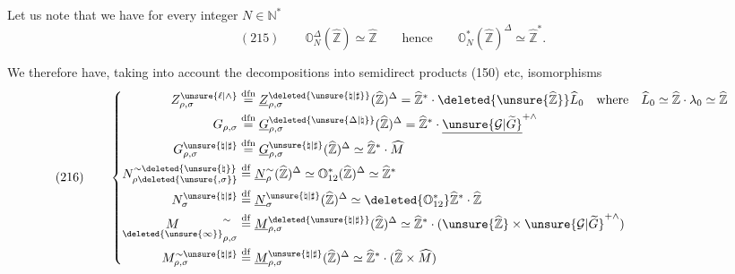 Let us note that we have for every integer $N\in\mathbb N^{*}$
\[
(215)\qquad
\mathbb O_{N}^{\Delta}
(\widehat{\mathbb Z})\simeq\widehat{\mathbb Z}
\qquad\text{hence}\qquad
\mathbb O_{N}^{*}(\widehat{\mathbb Z})^{\Delta}
\simeq\widehat{\mathbb Z}^{*}.
\]

We therefore have, taking into account the decompositions into semidirect products (150) etc,
isomorphisms
\[
(216)\qquad
\left\{\begin{aligned}
Z_{\rho,\sigma}^{\unsure{\ell|\wedge}}
&\overset{\mathrm{dfn}}{=}
\underline Z_{\rho,\sigma}^{\deleted{\unsure{\natural|\sharp}}}
(\widehat{\mathbb Z})^{\Delta}
=\widehat{\mathbb Z}^{*}\cdot
\deleted{\unsure{\widehat{\mathbb Z}}}\widehat L_0
\quad\text{where}\quad
\widehat L_0\simeq\widehat{\mathbb Z}\cdot\lambda_0\simeq\widehat{\mathbb Z}
\\
G_{\rho,\sigma}
&\overset{\mathrm{dfn}}{=}
\underline G_{\rho,\sigma}^{\deleted{\unsure{\Delta|\natural}}}
(\widehat{\mathbb Z})^{\Delta}
=\widehat{\mathbb Z}^{*}\cdot
\underline{\unsure{\mathcal G|\widetilde G}}^{+\wedge}
\\
G_{\rho,\sigma}^{\unsure{\natural|\sharp}}
&\overset{\mathrm{dfn}}{=}
\underline G_{\rho,\sigma}^{\unsure{\natural|\sharp}}
(\widehat{\mathbb Z})^{\Delta}
\simeq\widehat{\mathbb Z}^{*}\cdot\widehat M
\\
N_{\rho\deleted{\unsure{,\sigma}}}^{\sim\deleted{\unsure{\natural}}}
&\overset{\mathrm{df}}{=}
\underline N_\rho^{\sim}(\widehat{\mathbb Z})^{\Delta}
\simeq\mathbb O_{12}^{*}
(\widehat{\mathbb Z})^{\Delta}\simeq\widehat{\mathbb Z}^{*}
\\
N_\sigma^{\unsure{\natural|\sharp}}
&\overset{\mathrm{df}}{=}
\underline N_\sigma^{\unsure{\natural|\sharp}}
(\widehat{\mathbb Z})^{\Delta}
\simeq\deleted{\mathbb O_{12}^{*}}
\widehat{\mathbb Z}^{*}\cdot\widehat{\mathbb Z}
\\
\underset{\deleted{\unsure{\infty}}}{M}_{\rho,\sigma}^{\sim}
&\overset{\mathrm{df}}{=}
\underline M_{\rho,\sigma}^{\deleted{\unsure{\natural|\sharp}}}
(\widehat{\mathbb Z})^{\Delta}
\simeq\widehat{\mathbb Z}^{*}\cdot
(\unsure{\widehat{\mathbb Z}}\times
\unsure{\mathcal G|\widetilde G}^{+\wedge})
\\
M_{\rho,\sigma}^{\sim\unsure{\natural|\sharp}}
&\overset{\mathrm{df}}{=}
\underline M_{\rho,\sigma}^{\unsure{\natural|\sharp}}
(\widehat{\mathbb Z})^{\Delta}
\simeq\widehat{\mathbb Z}^{*}\cdot
(\widehat{\mathbb Z}\times\widehat M)
\end{aligned}\right.
\]

